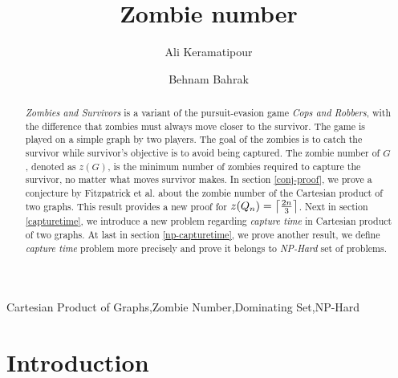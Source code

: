 \documentclass[1p]{elsarticle}
\DeclarePairedDelimiter\ceil{\lceil}{\rceil} \DeclarePairedDelimiter\floor{\lfloor}{\rfloor}
\begin{document}
	
	\begin{frontmatter}
		
		\title{Zombie number}
		
		
		\author{Ali Keramatipour}
		
		\author{Behnam Bahrak}
		
		\address{School of Electrical and Computer Engineering, College of Engineering, University of Tehran, Tehran, Iran}
		
		\begin{abstract}
		{\it Zombies and Survivors} is a variant of the pursuit-evasion game {\it Cops and Robbers}, with the difference
		that zombies must always move closer to the survivor. The game is played on a simple graph by two players. The
		goal of the zombies is to catch the survivor while survivor's objective is to avoid being captured. The zombie
		number of $G$, denoted as $z(G)$, is the minimum number of zombies required to capture the survivor, no matter
		what moves survivor makes. In section \ref{conj-proof}, we prove a conjecture by Fitzpatrick et al.\cite{Fitz16} about the
		zombie number of the Cartesian product of two graphs.  This result provides a new proof for $z(Q_n) =
		\ceil*{\frac{2n}{3}}$. Next in section \ref{capturetime}, we introduce a new problem regarding {\it capture time}
		in Cartesian product of two graphs. At last in section \ref{np-capturetime}, we prove another result, we define
		{\it capture time} problem more precisely and prove it belongs to {\it NP-Hard} set of problems. 
		\end{abstract}
		
		\begin{keyword}
			Cartesian Product of Graphs\sep Zombie Number\sep Dominating Set\sep NP-Hard
		\end{keyword}
		
	\end{frontmatter}
	
\section{Introduction}\label{section-introduction}
\end{document}
